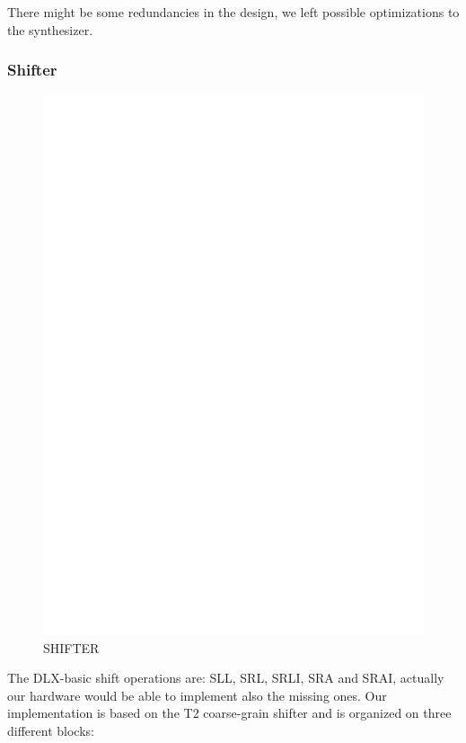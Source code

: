 \documentclass[12pt]{article}
\begin{document}
There might be some redundancies in the design, we left possible optimizations to the synthesizer.

\subsubsection{Shifter}
\begin{figure}[h]
	\includegraphics[width=\textwidth, center]{images/SHIFTER.eps}
	\caption{SHIFTER}
	\label{SHIFTER}
\end{figure}
The DLX-basic shift operations are: SLL, SRL, SRLI, SRA and SRAI, actually our hardware would be able to implement also the missing ones.
Our implementation is based on the T2 coarse-grain shifter and is organized on three different blocks:
\end{document}
